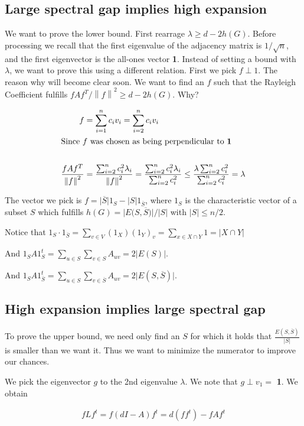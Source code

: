 \documentclass{article}
\newcommand{\norm}[1]{\left\lVert#1\right\rVert}
\newcommand{\abs}[1]{\lvert#1\rvert}
\begin{document}
\subsection{Large spectral gap implies high expansion}
We want to prove the lower bound. First rearrage $\lambda \geq d - 2h(G)$. Before processing we recall that the first eigenvalue of the adjacency matrix is $1/\sqrt{n}$, and the first eigenvector is the all-ones vector \textbf{1}. Instead of setting a bound with $\lambda$, we want to prove this using a different relation. First we pick $f \perp 1$. The reason why will become clear soon. We want to find an $f$ such that the Rayleigh Coefficient fulfills $fAf^T/\norm{f}^2 \geq d - 2h(G)$. Why? 

\begin{align*}
  f &= \sum^n_{i=1} c_i v_i = \sum^n_{i=2} c_i v_i \\
  \intertext{Since $f$ was chosen as being perpendicular to \textbf{1}} \\
  \frac{fAf^T}{\norm{f}^2} &= \frac{\sum^n_{i=2} c_i^2 \lambda_i}{\norm{f}^2} = \frac{\sum^n_{i=2} c_i^2 \lambda_i}{\sum^n_{i=2} c_i^2} \leq \frac{\lambda\sum^n_{i=2} c_i^2}{\sum^n_{i=2} c_i^2} = \lambda
\end{align*}

The vector we pick is $f = \abs{\overline{S}}1_S - \abs{S}1_{\overline{S}}$, where $1_S$ is the characteristic vector of a subset $S$ which fulfills $h(G) = \abs{E({S, \overline{S})}}/\abs{S}$ with $\abs{S} \leq n/2$.

Notice that $1_S\cdot1_{\overline{S}} = \sum_{v \in V} (1_X)(1_Y)_v = \sum_{x \in X \cap Y} 1 = \abs{X \cap Y}$

And $1_SA1_S^t = \sum_{u \in S}\sum_{v \in S}A_{uv} = 2\abs{E(S)}$.

And $1_SA1_{\overline{S}}^t = \sum_{u \in S}\sum_{v \in \overline{S}}A_{uv} = 2\abs{E(S, \overline{S})}$.

\subsection{High expansion implies large spectral gap }
To prove the upper bound, we need only find an $S$ for which it holds that $\frac{E(S, \overline{S})}{\abs{S}}$ is smaller than we want it. Thus we want to minimize the numerator to improve our chances.

We pick the eigenvector $g$ to the 2nd eigenvalue $\lambda$. We note that $g \perp v_1 =$ \textbf{1}. We obtain


\begin{align*}
  fLf^t = f(dI - A)f^t = d(ff^t) - fAf^t
\end{align*}
\end{document}
